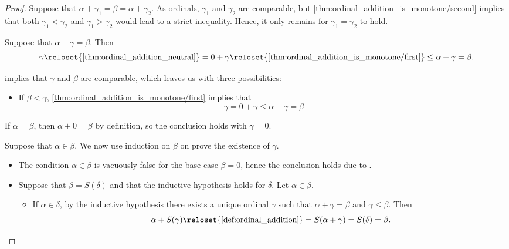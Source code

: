 \begin{proof}
  \SufficiencySubProof

  \UniquenessSubProof* Suppose that \( \alpha + \gamma_1 = \beta = \alpha + \gamma_2 \). As ordinals, \( \gamma_1 \) and \( \gamma_2 \) are comparable, but \cref{thm:ordinal_addition_is_monotone/second} implies that both \( \gamma_1 < \gamma_2 \) and \( \gamma_1 > \gamma_2 \) would lead to a strict inequality. Hence, it only remains for \( \gamma_1 = \gamma_2 \) to hold.

   Suppose that \( \alpha + \gamma = \beta \). Then
  \begin{equation*}
    \gamma
    \reloset {\ref{thm:ordinal_addition_neutral}} =
    0 + \gamma
    \reloset {\ref{thm:ordinal_addition_is_monotone/first}} \leq
    \alpha + \gamma
    =
    \beta.
  \end{equation*}

   implies that \( \gamma \) and \( \beta \) are comparable, which leaves us with three possibilities:
  \begin{itemize}
    \item If \( \beta < \gamma \), \cref{thm:ordinal_addition_is_monotone/first} implies that
    \begin{equation*}
      \gamma = 0 + \gamma \leq \alpha + \gamma = \beta
    \end{equation*}
  \end{itemize}

  \ExistenceSubProof* If \( \alpha = \beta \), then \( \alpha + 0 = \beta \) by definition, so the conclusion holds with \( \gamma = 0 \).

  Suppose that \( \alpha \in \beta \). We now use induction on \( \beta \) on prove the existence of \( \gamma \).
  \begin{itemize}
    \item The condition \( \alpha \in \beta \) is vacuously false for the base case \( \beta = 0 \), hence the conclusion holds due to .

    \item Suppose that \( \beta = S(\delta) \) and that the inductive hypothesis holds for \( \delta \). Let \( \alpha \in \beta \).
    \begin{itemize}
      \item If \( \alpha \in \delta \), by the inductive hypothesis there exists a unique ordinal \( \gamma \) such that \( \alpha + \gamma = \beta \) and \( \gamma \leq \beta \). Then
      \begin{equation*}
        \alpha + S(\gamma)
        \reloset {\ref{def:ordinal_addition}} =
        S(\alpha + \gamma)
        =
        S(\delta)
        =
        \beta.
      \end{equation*}


\end{itemize}
\end{itemize}
\end{proof}
